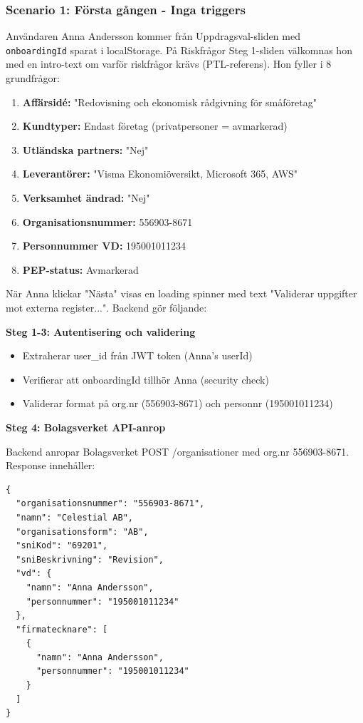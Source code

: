 \subsubsection{Scenario 1: Första gången - Inga triggers}

Användaren Anna Andersson kommer från Uppdragsval-sliden med \texttt{onboardingId} sparat i localStorage. På Riskfrågor Steg 1-sliden välkomnas hon med en intro-text om varför riskfrågor krävs (PTL-referens). Hon fyller i 8 grundfrågor:

\begin{enumerate}[noitemsep]
  \item \textbf{Affärsidé:} "Redovisning och ekonomisk rådgivning för småföretag"
  \item \textbf{Kundtyper:} Endast företag (privatpersoner = avmarkerad)
  \item \textbf{Utländska partners:} "Nej"
  \item \textbf{Leverantörer:} "Visma Ekonomiöversikt, Microsoft 365, AWS"
  \item \textbf{Verksamhet ändrad:} "Nej"
  \item \textbf{Organisationsnummer:} 556903-8671
  \item \textbf{Personnummer VD:} 195001011234
  \item \textbf{PEP-status:} Avmarkerad
\end{enumerate}

När Anna klickar "Nästa" visas en loading spinner med text "Validerar uppgifter mot externa register...". Backend gör följande:

\textbf{Steg 1-3: Autentisering och validering}
\begin{itemize}[noitemsep]
  \item Extraherar user\_id från JWT token (Anna's userId)
  \item Verifierar att onboardingId tillhör Anna (security check)
  \item Validerar format på org.nr (556903-8671) och personnr (195001011234)
\end{itemize}

\textbf{Steg 4: Bolagsverket API-anrop}

Backend anropar Bolagsverket POST /organisationer med org.nr 556903-8671. Response innehåller:
\begin{lstlisting}
{
  "organisationsnummer": "556903-8671",
  "namn": "Celestial AB",
  "organisationsform": "AB",
  "sniKod": "69201",
  "sniBeskrivning": "Revision",
  "vd": {
    "namn": "Anna Andersson",
    "personnummer": "195001011234"
  },
  "firmatecknare": [
    {
      "namn": "Anna Andersson",
      "personnummer": "195001011234"
    }
  ]
}
\end{lstlisting}

